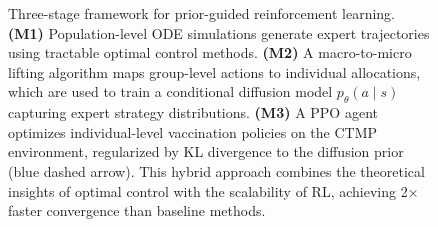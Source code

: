 \begin{figure}[t]
{
}%
\caption{Three-stage framework for prior-guided reinforcement learning.
\textbf{(M1)} Population-level ODE simulations generate expert trajectories using
tractable optimal control methods.
\textbf{(M2)} A macro-to-micro lifting algorithm maps group-level actions to
individual allocations, which are used to train a conditional diffusion model
$p_\theta(a \mid s)$ capturing expert strategy distributions.
\textbf{(M3)} A PPO agent optimizes individual-level vaccination policies on the
CTMP environment, regularized by KL divergence to the diffusion prior (blue dashed arrow).
This hybrid approach combines the theoretical insights of optimal control with the
scalability of RL, achieving 2× faster convergence than baseline methods.}
\label{fig:pipeline}
\end{figure}
